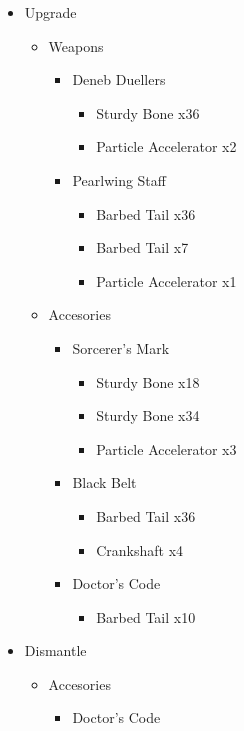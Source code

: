 \begin{upgrade}
	\begin{itemize}
		\item Upgrade
			\begin{itemize}
				\item Weapons
					\begin{itemize}
						\item Deneb Duellers
							\begin{itemize}
								\item Sturdy Bone x36
								\item Particle Accelerator x2
							\end{itemize}
						\item Pearlwing Staff
							\begin{itemize}
								\item Barbed Tail x36
								\item Barbed Tail x7
								\item Particle Accelerator x1
							\end{itemize}
					\end{itemize}
				\item Accesories
					\begin{itemize}
						\item Sorcerer's Mark
							\begin{itemize}
								\item Sturdy Bone x18
								\item Sturdy Bone x34
								\item Particle Accelerator x3
							\end{itemize}
						\item Black Belt
							\begin{itemize}
								\item Barbed Tail x36
								\item Crankshaft x4
							\end{itemize}
						\item Doctor's Code
							\begin{itemize}
								\item Barbed Tail x10
							\end{itemize}
					\end{itemize}
			\end{itemize}
		\item Dismantle
			\begin{itemize}
				\item Accesories
					\begin{itemize}
						\item Doctor's Code
					\end{itemize}
			\end{itemize}
	\end{itemize}
\end{upgrade}
